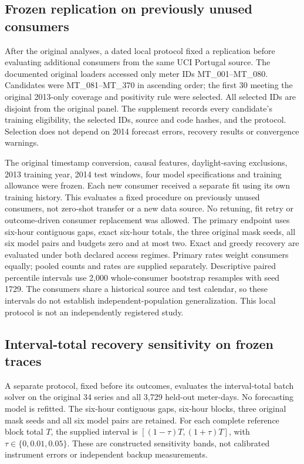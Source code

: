 \documentclass[12pt]{article}
\begin{document}
\subsection{Frozen replication on previously unused consumers}\label{app:replication-design}
After the original analyses, a dated local protocol fixed a replication
before evaluating additional consumers from the same UCI Portugal source.
The documented original loaders accessed only meter IDs MT\_001--MT\_080.
Candidates were MT\_081--MT\_370 in ascending order; the first 30 meeting
the original 2013-only coverage and positivity rule were selected.
All selected IDs are disjoint from the original panel. The supplement
records every candidate's training eligibility, the selected IDs, source
and code hashes, and the protocol. Selection does not depend on 2014
forecast errors, recovery results or convergence warnings.

The original timestamp conversion, causal features, daylight-saving
exclusions, 2013 training year, 2014 test windows, four model specifications
and training allowance were frozen. Each new consumer received a separate
fit using its own training history. This evaluates a fixed procedure on
previously unused consumers, not zero-shot transfer or a new data source.
No retuning, fit retry or outcome-driven consumer replacement was allowed.
The primary endpoint uses six-hour contiguous gaps, exact six-hour totals,
the three original mask seeds, all six model pairs and budgets zero and
at most two. Exact and greedy recovery are evaluated under both declared
access regimes. Primary rates weight consumers equally; pooled counts and
rates are supplied separately. Descriptive paired percentile intervals
use 2,000 whole-consumer bootstrap resamples with seed 1729. The consumers
share a historical source and test calendar, so these intervals do not
establish independent-population generalization. This local protocol is
not an independently registered study.



\subsection{Interval-total recovery sensitivity on frozen traces}\label{app:interval-design}
A separate protocol, fixed before its outcomes, evaluates the interval-total
batch solver on the original 34 series and all 3,729 held-out meter-days.
No forecasting model is refitted. The six-hour contiguous gaps, six-hour
blocks, three original mask seeds and all six model pairs are retained.
For each complete reference block total $T$, the supplied interval is
$[(1-\tau)T,(1+\tau)T]$, with $\tau\in\{0,0.01,0.05\}$.
These are constructed sensitivity bands, not calibrated instrument errors
or independent backup measurements.
\end{document}
